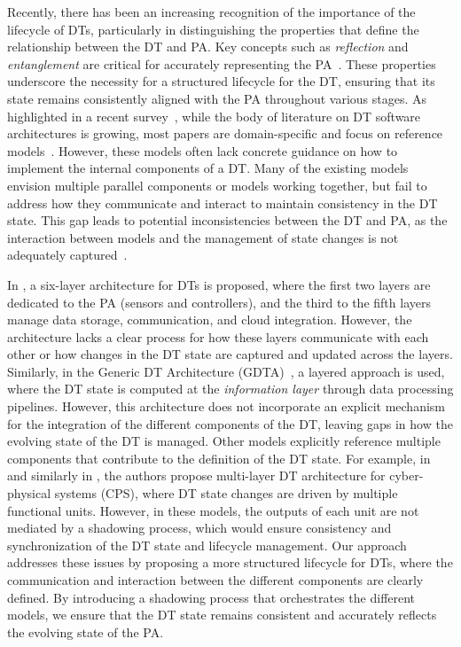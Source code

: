 Recently, there has been an increasing recognition of the importance of the lifecycle of \acp{DT}, particularly in distinguishing the properties that define the relationship between the \ac{DT} and \ac{PA}. Key concepts such as \emph{reflection} and \emph{entanglement} are critical for accurately representing the \ac{PA}~\cite{dt-IoT-context-Minerva-2020, web_of_dt}. These properties underscore the necessity for a structured lifecycle for the \ac{DT}, ensuring that its state remains consistently aligned with the \ac{PA} throughout various stages. As highlighted in a recent survey~\cite{ferko2022architecting, 9640612, HRIBERNIK2021103508}, while the body of literature on \ac{DT} software architectures is growing, most papers are domain-specific and focus on reference models~\cite{1999daglib}. However, these models often lack concrete guidance on how to implement the internal components of a \ac{DT}. Many of the existing models envision multiple parallel components or models working together, but fail to address how they communicate and interact to maintain consistency in the \ac{DT} state. This gap leads to potential inconsistencies between the \ac{DT} and \ac{PA}, as the interaction between models and the management of state changes is not adequately captured~\cite{alam2017access,Malakuti2019fourlayer,Lpez2021}.

In \cite{Redelinghuys2019}, a six-layer architecture for \acp{DT} is proposed, where the first two layers are dedicated to the \ac{PA} (sensors and controllers), and the third to the fifth layers manage data storage, communication, and cloud integration. However, the architecture lacks a clear process for how these layers communicate with each other or how changes in the \ac{DT} state are captured and updated across the layers. Similarly, in the Generic \ac{DT} Architecture (GDTA)~\cite{app10248903}, a layered approach is used, where the \ac{DT} state is computed at the \emph{information layer} through data processing pipelines. However, this architecture does not incorporate an explicit mechanism for the integration of the different components of the \ac{DT}, leaving gaps in how the evolving state of the \ac{DT} is managed. Other models explicitly reference multiple components that contribute to the definition of the \ac{DT} state. For example, in \cite{alam2017access} and similarly in \cite{Malakuti2019fourlayer}, the authors propose multi-layer \ac{DT} architecture for cyber-physical systems (CPS), where \ac{DT} state changes are driven by multiple functional units. However, in these models, the outputs of each unit are not mediated by a shadowing process, which would ensure consistency and synchronization of the \ac{DT} state and lifecycle management. Our approach addresses these issues by proposing a more structured lifecycle for \acp{DT}, where the communication and interaction between the different components are clearly defined. By introducing a shadowing process that orchestrates the different models, we ensure that the \ac{DT} state remains consistent and accurately reflects the evolving state of the \ac{PA}.


